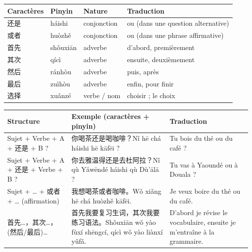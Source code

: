 \documentclass[11pt]{article}
\begin{document}
\begin{aretenir}
\begin{center}
\begin{tabularx}{\linewidth}{|X|X|X|X|}
\hline
\rowcolor{popblueL} Caractères & Pinyin & Nature & Traduction \\
\hline
还是 & háishi & conjonction & ou (dans une question alternative) \\
\hline
或者 & huòzhě & conjonction & ou (dans une phrase affirmative) \\
\hline
首先 & shǒuxiān & adverbe & d'abord, premièrement \\
\hline
其次 & qícì & adverbe & ensuite, deuxièmement \\
\hline
然后 & ránhòu & adverbe & puis, après \\
\hline
最后 & zuìhòu & adverbe & enfin, pour finir \\
\hline
选择 & xuǎnzé & verbe / nom & choisir ; le choix \\
\hline
\end{tabularx}
\end{center}
\end{aretenir}

\begin{propriete}
\begin{center}
\begin{tabularx}{\linewidth}{|X|X|X|}
\hline
\rowcolor{popblueL} Structure & Exemple (caractères + pinyin) & Traduction \\
\hline
Sujet + Verbe + A + 还是 + B ? & 你喝茶还是喝咖啡？\newline Nǐ hē chá háishi hē kāfēi ? & Tu bois du thé ou du café ? \\
\hline
Sujet + Verbe + A + 还是 + Verbe + B ? & 你去雅温得还是去杜阿拉？\newline Nǐ qù Yǎwēndé háishi qù Dù'ālā ? & Tu vas à Yaoundé ou à Douala ? \\
\hline
Sujet + … + 或者 + … (affirmation) & 我想喝茶或者咖啡。\newline Wǒ xiǎng hē chá huòzhě kāfēi. & Je veux boire du thé ou du café. \\
\hline
首先…，其次…，(然后/最后)… & 首先我要复习生词，其次我要练习语法。\newline Shǒuxiān wǒ yào fùxí shēngcí, qícì wǒ yào liànxí yǔfǎ. & D'abord je révise le vocabulaire, ensuite je m'entraîne à la grammaire. \\
\hline
\end{tabularx}
\end{center}
\end{propriete}
\end{document}
